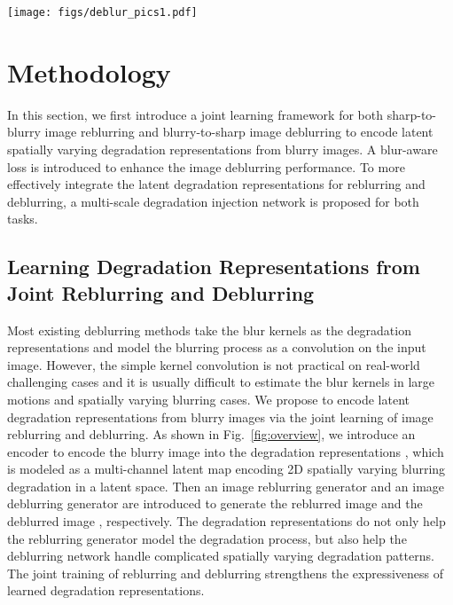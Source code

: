 \documentclass[runningheads]{llncs}
\begin{document}
\begin{figure*}[t]
  \centering
   \texttt{[image: figs/deblur\_pics1.pdf]}
   \caption{Learning degradation representations with reblurring and deblurring.}
   \label{fig:overview}
\end{figure*}

\section{Methodology}

In this section, we first introduce a joint learning framework for both sharp-to-blurry image reblurring and blurry-to-sharp image deblurring to encode latent spatially varying degradation representations from blurry images. A blur-aware loss is introduced to enhance the image deblurring performance.
To more effectively integrate the latent degradation representations for reblurring and deblurring, a multi-scale degradation injection network is proposed for both tasks.

\subsection{Learning Degradation Representations from Joint Reblurring and Deblurring} \label{sec31}
Most existing deblurring methods \cite{Learning_to_deblur,blind_dark_channel,blind_spectral,hyper_laplacian,total_variation} take the blur kernels as the degradation representations and model the blurring process as a convolution on the input image. However, the simple kernel convolution is not practical on real-world challenging cases and it is usually difficult to estimate the blur kernels in large motions and spatially varying blurring cases. 
We propose to encode latent degradation representations from blurry images via the joint learning of image reblurring and deblurring. 
As shown in Fig.~\ref{fig:overview}, we introduce an encoder  to encode the blurry image  into the degradation representations , which is modeled as a multi-channel latent map encoding 2D spatially varying blurring degradation in a latent space.
Then an image reblurring generator  and an image deblurring generator  are introduced to generate the reblurred image  and the deblurred image , respectively. 
The degradation representations do not only help the reblurring generator  model the degradation process, but also help the deblurring network handle complicated spatially varying degradation patterns.
The joint training of reblurring and deblurring strengthens the expressiveness of learned degradation representations. 
\end{document}
